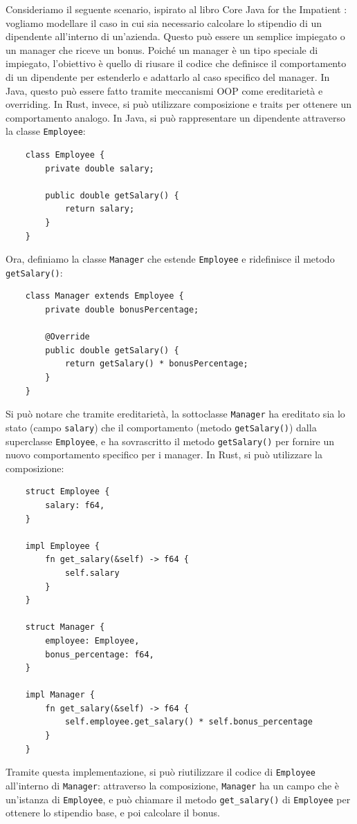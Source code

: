 Consideriamo il seguente scenario, ispirato al libro Core Java for the Impatient \cite{horstmann-java-impatient}: vogliamo modellare il caso in cui sia necessario calcolare lo stipendio di un dipendente all'interno di un'azienda. Questo può essere un semplice impiegato o un manager che riceve un bonus. Poiché un manager è un tipo speciale di impiegato, l'obiettivo è quello di riusare il codice che definisce il comportamento di un dipendente per estenderlo e adattarlo al caso specifico del manager. In Java, questo può essere fatto tramite meccanismi OOP come ereditarietà e overriding. In Rust, invece, si può utilizzare composizione e traits per ottenere un comportamento analogo. In Java, si può rappresentare un dipendente attraverso la classe \texttt{Employee}:
\begin{verbatim}
    class Employee {
        private double salary;
        
        public double getSalary() {
            return salary;
        }
    }
\end{verbatim}
Ora, definiamo la classe \texttt{Manager} che estende \texttt{Employee} e ridefinisce il metodo \texttt{getSalary()}:
\begin{verbatim}
    class Manager extends Employee {
        private double bonusPercentage;

        @Override
        public double getSalary() {
            return getSalary() * bonusPercentage;
        }
    }
\end{verbatim}
Si può notare che tramite ereditarietà, la sottoclasse \texttt{Manager} ha ereditato sia lo stato (campo \texttt{salary}) che il comportamento (metodo \texttt{getSalary()}) dalla superclasse \texttt{Employee}, e ha sovrascritto il metodo \texttt{getSalary()} per fornire un nuovo comportamento specifico per i manager. In Rust, si può utilizzare la composizione:
\begin{verbatim}
    struct Employee {
        salary: f64,
    }

    impl Employee {
        fn get_salary(&self) -> f64 {
            self.salary
        }
    }

    struct Manager {
        employee: Employee,
        bonus_percentage: f64,
    }

    impl Manager {
        fn get_salary(&self) -> f64 {
            self.employee.get_salary() * self.bonus_percentage
        }
    }
\end{verbatim}
Tramite questa implementazione, si può riutilizzare il codice di \texttt{Employee} all'interno di \texttt{Manager}: attraverso la composizione, \texttt{Manager} ha un campo che è un'istanza di \texttt{Employee}, e può chiamare il metodo \texttt{get\_salary()} di \texttt{Employee} per ottenere lo stipendio base, e poi calcolare il bonus.

